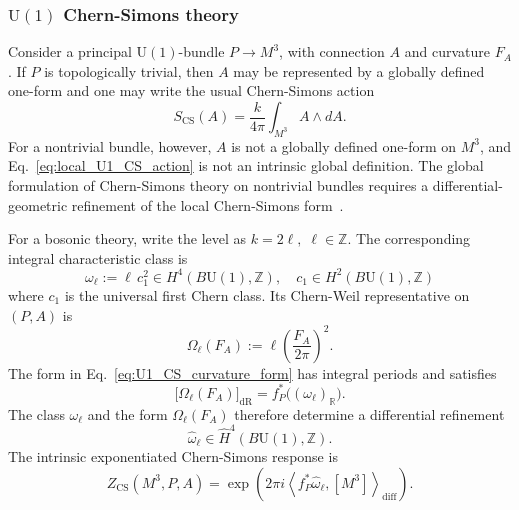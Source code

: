 \documentclass[aps,prx,reprint,superscriptaddress,twocolumn,amsmath,amssymb,amsfonts, nofootinbib]{revtex4-2}
\newcommand{\U}{\text{U}}
\theoremstyle{apsstyle}
\begin{document}
\subsubsection{$\U(1)$ Chern-Simons theory}

Consider a principal $\U(1)$-bundle $P\longrightarrow M^3$, with connection $A$ and curvature $F_A$. If $P$ is topologically trivial, then $A$ may be represented by a globally defined one-form and one may write the usual Chern-Simons action
\begin{equation}
    S_{\mathrm{CS}}(A) =
    \frac{k}{4\pi}
    \int_{M^3}A\wedge dA.
    \label{eq:local_U1_CS_action}
\end{equation}
For a nontrivial bundle, however, $A$ is not a globally defined one-form on $M^3$, and Eq.~\eqref{eq:local_U1_CS_action} is not an intrinsic global definition. The global formulation of Chern-Simons theory on
nontrivial bundles requires a differential-geometric refinement of the
local Chern-Simons form~\cite{ChernSimons1974,Freed1995}.

\noindent For a bosonic theory, write the level as $k=2\ell,\;\ell\in\mathbb Z$. The corresponding integral characteristic class is
\begin{equation}
    \omega_{\ell} := \ell\,c_1^2 \in
    H^4(B\U(1),\mathbb Z),\quad c_1\in H^2(B\U(1),\mathbb Z)
    \label{eq:U1_CS_integral_class}
\end{equation}
where $c_{1}$ is the universal first Chern class. Its Chern-Weil representative on $(P,A)$ is
\begin{equation}
    \Omega_{\ell}(F_A)
    :=
    \ell
    \left(
        \frac{F_A}{2\pi}
    \right)^2.
    \label{eq:U1_CS_curvature_form}
\end{equation}
The form in Eq.~\eqref{eq:U1_CS_curvature_form} has integral periods
and satisfies
\begin{equation*}
    \bigl[\Omega_{\ell}(F_A)\bigr]_{\mathrm{dR}}
    =
    f_P^*\bigl((\omega_{\ell})_{\mathbb R}\bigr).
\end{equation*}
The class $\omega_{\ell}$ and the form
$\Omega_{\ell}(F_A)$ therefore determine a differential refinement
\begin{equation*}
    \widehat\omega_{\ell}
    \in
    \widehat H^4(B\U(1),\mathbb Z).
\end{equation*}
The intrinsic exponentiated Chern-Simons response is
\begin{equation}
    Z_{\mathrm{CS}}(M^3,P,A)
    =
    \exp\left(
        2\pi i
        \left\langle
            f_P^*\widehat\omega_{\ell},
            [M^3]
        \right\rangle_{\mathrm{diff}}
    \right).
    \label{eq:intrinsic_U1_CS_response}
\end{equation}
\end{document}
